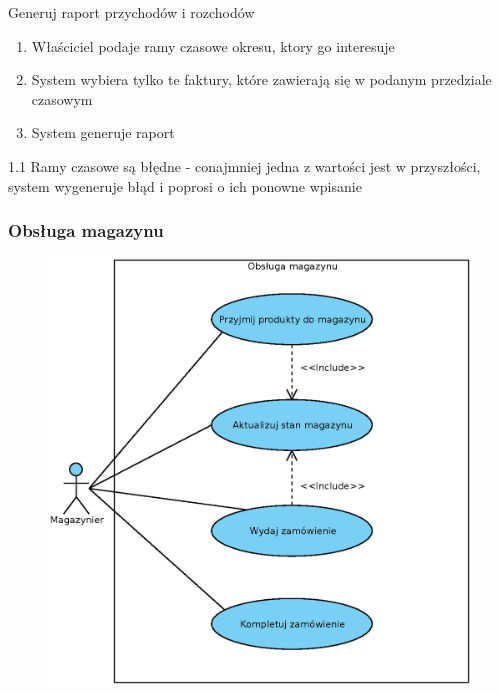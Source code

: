	\begin{usecase}{Generuj raport przychodów i rozchodów}
		\author{Arkadiusz Socha} 
		\maketitle
\begin{scenario}
 
			\begin{enumerate}
				\item Właściciel podaje ramy czasowe okresu, ktory go interesuje
				\item System wybiera tylko te faktury, które zawierają się w podanym przedziale czasowym
				\item System generuje raport
			\end{enumerate}
		\end{scenario}
\begin{extensions}
		1.1 Ramy czasowe są błędne - conajmniej jedna z wartości jest w przyszłości, system wygeneruje błąd i poprosi o ich ponowne wpisanie
	\end{extensions}
\end{usecase}

\subsubsection{Obsługa magazynu}

	\begin{figure}[H]
		\centering
		\includegraphics[width=.8\textwidth]{img/UC/magazyn.eps}
	\end{figure}

